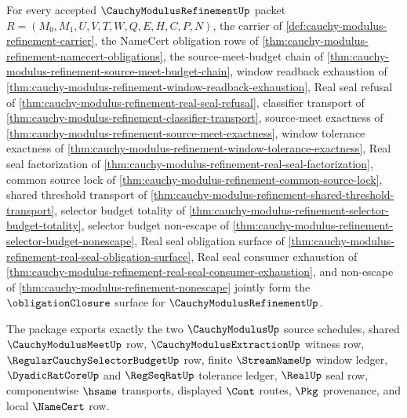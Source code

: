 \begin{theorem}
\label{thm:cauchy-modulus-refinement-obligation-closure-package}
For every accepted $\CauchyModulusRefinementUp$ packet $R=(M_0,M_1,U,V,T,W,Q,E,H,C,P,N)$, the carrier of \autoref{def:cauchy-modulus-refinement-carrier}, the NameCert obligation rows of \autoref{thm:cauchy-modulus-refinement-namecert-obligations}, the source-meet-budget chain of \autoref{thm:cauchy-modulus-refinement-source-meet-budget-chain}, window readback exhaustion of \autoref{thm:cauchy-modulus-refinement-window-readback-exhaustion}, Real seal refusal of \autoref{thm:cauchy-modulus-refinement-real-seal-refusal}, classifier transport of \autoref{thm:cauchy-modulus-refinement-classifier-transport}, source-meet exactness of \autoref{thm:cauchy-modulus-refinement-source-meet-exactness}, window tolerance exactness of \autoref{thm:cauchy-modulus-refinement-window-tolerance-exactness}, Real seal factorization of \autoref{thm:cauchy-modulus-refinement-real-seal-factorization}, common source lock of \autoref{thm:cauchy-modulus-refinement-common-source-lock}, shared threshold transport of \autoref{thm:cauchy-modulus-refinement-shared-threshold-transport}, selector budget totality of \autoref{thm:cauchy-modulus-refinement-selector-budget-totality}, selector budget non-escape of \autoref{thm:cauchy-modulus-refinement-selector-budget-nonescape}, Real seal obligation surface of \autoref{thm:cauchy-modulus-refinement-real-seal-obligation-surface}, Real seal consumer exhaustion of \autoref{thm:cauchy-modulus-refinement-real-seal-consumer-exhaustion}, and non-escape of \autoref{thm:cauchy-modulus-refinement-nonescape} jointly form the $\obligationClosure$ surface for $\CauchyModulusRefinementUp$.

The package exports exactly the two $\CauchyModulusUp$ source schedules, shared $\CauchyModulusMeetUp$ row, $\CauchyModulusExtractionUp$ witness row, $\RegularCauchySelectorBudgetUp$ row, finite $\StreamNameUp$ window ledger, $\DyadicRatCoreUp$ and $\RegSeqRatUp$ tolerance ledger, $\RealUp$ seal row, componentwise $\hsame$ transports, displayed $\Cont$ routes, $\Pkg$ provenance, and local $\NameCert$ row.
\end{theorem}
